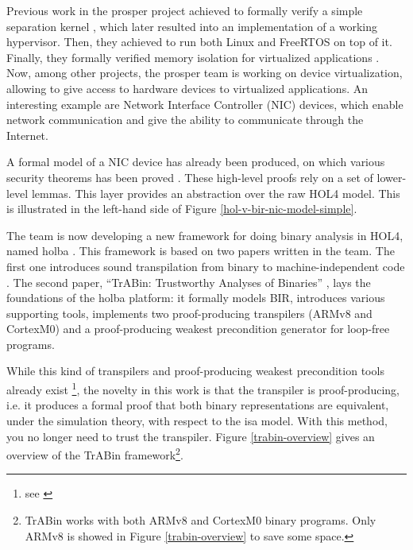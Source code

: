 \documentclass{kththesis}
\begin{document}
Previous work in the \acrshort{prosper} project achieved \cite{noauthor_prosper:_nodate-1} to formally verify a simple separation kernel \cite{dam_formal_2013}, which later resulted into an implementation of a working hypervisor. Then, they achieved to run both Linux and \gls{FreeRTOS} on top of it. Finally, they formally verified memory isolation for virtualized applications \cite{nemati_trustworthy_2015}. Now, among other projects, the \acrshort{prosper} team is working on device virtualization, allowing to give access to hardware devices to virtualized applications. An interesting example are Network Interface Controller (NIC) devices, which enable network communication and give the ability to communicate through the Internet.

A formal model of a NIC device has already been produced, on which various security theorems has been proved \cite{haglund_formal_2016}. These high-level proofs rely on a set of lower-level lemmas. This layer provides an abstraction over the raw HOL4 model. This is illustrated in the left-hand side of Figure \ref{hol-v-bir-nic-model-simple}.

The team is now developing a new framework for doing binary analysis in HOL4, named \gls{holba} \cite{noauthor_holba_2019}. This framework is based on two papers written in the team. The first one introduces sound \gls{transpilation} from binary to machine-independent code \footnotemark \cite{metere_sound_2017}. The second paper, ``TrABin: Trustworthy Analyses of Binaries'' \cite{lindner_trabin:_2019}, lays the foundations of the \gls{holba} platform: it formally models \gls{BIR}, introduces various supporting tools, implements two proof-producing \glspl{transpiler} (ARMv8 and CortexM0) and a proof-producing weakest precondition generator for loop-free programs.


While this kind of \glspl{transpiler} and proof-producing weakest precondition tools already exist \footnote{see \cite{lindner_trabin:_2019}}, the novelty in this work is that the transpiler is proof-producing, i.e. it produces a formal proof that both binary representations are equivalent, under the simulation theory, with respect to the \gls{isa} model. With this method, you no longer need to trust the transpiler. Figure \ref{trabin-overview} gives an overview of the TrABin framework\footnote{TrABin works with both ARMv8 and CortexM0 binary programs. Only ARMv8 is showed in Figure \ref{trabin-overview} to save some space.}.
\end{document}
